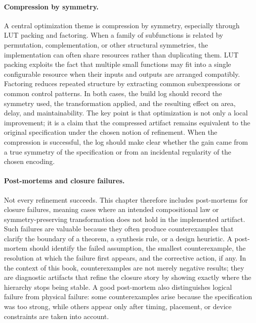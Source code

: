 \paragraph{Compression by symmetry.}
A central optimization theme is compression by symmetry, especially through LUT packing and factoring. When a family of subfunctions is related by permutation, complementation, or other structural symmetries, the implementation can often share resources rather than duplicating them. LUT packing exploits the fact that multiple small functions may fit into a single configurable resource when their inputs and outputs are arranged compatibly. Factoring reduces repeated structure by extracting common subexpressions or common control patterns. In both cases, the build log should record the symmetry used, the transformation applied, and the resulting effect on area, delay, and maintainability. The key point is that optimization is not only a local improvement; it is a claim that the compressed artifact remains equivalent to the original specification under the chosen notion of refinement. When the compression is successful, the log should make clear whether the gain came from a true symmetry of the specification or from an incidental regularity of the chosen encoding.

\paragraph{Post-mortems and closure failures.}
Not every refinement succeeds. This chapter therefore includes post-mortems for closure failures, meaning cases where an intended compositional law or symmetry-preserving transformation does not hold in the implemented artifact. Such failures are valuable because they often produce counterexamples that clarify the boundary of a theorem, a synthesis rule, or a design heuristic. A post-mortem should identify the failed assumption, the smallest counterexample, the resolution at which the failure first appears, and the corrective action, if any. In the context of this book, counterexamples are not merely negative results; they are diagnostic artifacts that refine the closure story by showing exactly where the hierarchy stops being stable. A good post-mortem also distinguishes logical failure from physical failure: some counterexamples arise because the specification was too strong, while others appear only after timing, placement, or device constraints are taken into account.

